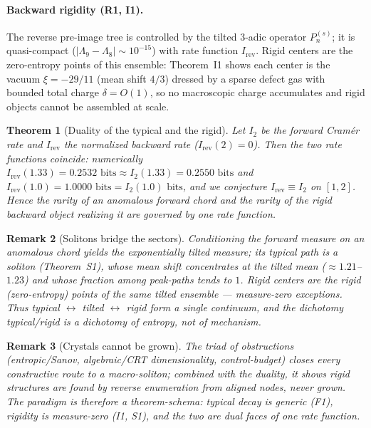 \documentclass[12pt,a4paper]{article}
\newtheorem{theorem}{Theorem}[section]
\newtheorem{remark}[theorem]{Remark}
\begin{document}
\paragraph{Backward rigidity (R1, I1).} The reverse pre-image tree is
controlled by the tilted $3$-adic operator $P_n^{(s)}$; it is quasi-compact
($|\Lambda_9-\Lambda_8|\sim10^{-15}$) with rate function $I_{\mathrm{rev}}$.
Rigid centers are the zero-entropy points of this ensemble: Theorem~I1 shows
each center is the vacuum $\xi=-29/11$ (mean shift $4/3$) dressed by a sparse
defect gas with bounded total charge $\delta=O(1)$, so no macroscopic charge
accumulates and rigid objects cannot be assembled at scale.

\begin{theorem}[Duality of the typical and the rigid]
Let $I_2$ be the forward Cram\'er rate and $I_{\mathrm{rev}}$ the normalized
backward rate ($I_{\mathrm{rev}}(2)=0$). Then the two rate functions coincide:
numerically $I_{\mathrm{rev}}(1.33)=0.2532\text{ bits}\approx I_2(1.33)=0.2550\text{ bits}$ and
$I_{\mathrm{rev}}(1.0)=1.0000\text{ bits}=I_2(1.0)\text{ bits}$, and we conjecture
$I_{\mathrm{rev}}\equiv I_2$ on $[1,2]$. Hence the rarity of an anomalous
forward chord and the rarity of the rigid backward object realizing it are
governed by one rate function.
\end{theorem}

\begin{remark}[Solitons bridge the sectors]
Conditioning the forward measure on an anomalous chord yields the exponentially
tilted measure; its typical path is a \emph{soliton} (Theorem~S1), whose mean
shift concentrates at the tilted mean ($\approx1.21$--$1.23$) and whose
fraction among peak-paths tends to $1$. Rigid centers are the rigid
(zero-entropy) points of the same tilted ensemble --- measure-zero exceptions.
Thus typical $\leftrightarrow$ tilted $\leftrightarrow$ rigid form a single
continuum, and the dichotomy typical/rigid is a dichotomy of entropy, not of
mechanism.
\end{remark}

\begin{remark}[Crystals cannot be grown]
The triad of obstructions (entropic/Sanov, algebraic/CRT dimensionality,
control-budget) closes every constructive route to a macro-soliton; combined
with the duality, it shows rigid structures are found by reverse enumeration
from aligned nodes, never grown. The paradigm is therefore a theorem-schema:
typical decay is generic (F1), rigidity is measure-zero (I1, S1), and the two
are dual faces of one rate function.
\end{remark}
\end{document}
